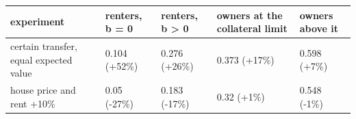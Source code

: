 \begingroup\small
\setlength{\tabcolsep}{3pt}
\renewcommand{\arraystretch}{1.04}
\begin{tabularx}{\linewidth}{XXXXX}
\toprule
experiment & renters, b = 0 & renters, b \textgreater{} 0 & owners at the collateral limit & owners above it \\
\midrule
certain transfer, equal expected value & 0.104 (+52\%) & 0.276 (+26\%) & 0.373 (+17\%) & 0.598 (+7\%) \\
house price and rent +10\% & 0.05 (-27\%) & 0.183 (-17\%) & 0.32 (+1\%) & 0.548 (-1\%) \\
\bottomrule
\end{tabularx}
\endgroup
